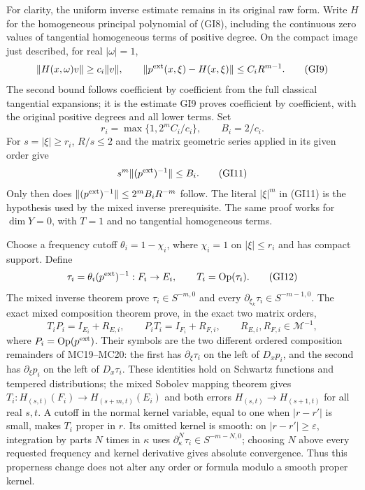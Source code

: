 \documentclass[
  11pt,
]{article}
\begin{document}
For clarity, the uniform inverse estimate remains in its original raw
form. Write \(H\) for the homogeneous principal polynomial of (GI8),
including the continuous zero values of tangential homogeneous terms of
positive degree. On the compact image just described, for real
\(|\omega|=1\), \[
 \|H(x,\omega)v\|\geq c_i\|v\|,
 \qquad \|p^{\rm ext}(x,\xi)-H(x,\xi)\|
 \leq C_i R^{m-1}.
 \tag{GI9}
\] The second bound follows coefficient by coefficient from the full
classical tangential expansions; it is the estimate GI9 proves
coefficient by coefficient, with the original positive degrees and all
lower terms. Set \[
 r_i=\max\{1,2^mC_i/c_i\},\qquad B_i=2/c_i.
 \tag{GI10}
\] For \(s=|\xi|\geq r_i\), \(R/s\leq2\) and the matrix geometric series
applied in its given order give \[
 s^m\|(p^{\rm ext})^{-1}\|\leq B_i.
 \tag{GI11}
\] Only then does \(\|(p^{\rm ext})^{-1}\|\leq2^mB_iR^{-m}\) follow. The
literal \(|\xi|^m\) in (GI11) is the hypothesis used by the mixed
inverse prerequisite. The same proof works for \(\dim Y=0\), with
\(T=1\) and no tangential homogeneous terms.

Choose a frequency cutoff \(\theta_i=1-\chi_i\), where \(\chi_i=1\) on
\(|\xi|\leq r_i\) and has compact support. Define \[
 \tau_i=\theta_i(p^{\rm ext})^{-1}:F_i\to E_i,
 \qquad T_i=\operatorname{Op}(\tau_i).
 \tag{GI12}
\] The mixed inverse theorem prove \(\tau_i\in S^{-m,0}\) and every
\(\partial_{\xi_k}\tau_i\in S^{-m-1,0}\). The exact mixed composition
theorem prove, in the exact two matrix orders, \[
 T_iP_i=I_{E_i}+R_{E,i},\qquad
 P_iT_i=I_{F_i}+R_{F,i},\qquad
 R_{E,i},R_{F,i}\in\mathscr M^{-1},
 \tag{GI13}
\] where \(P_i=\operatorname{Op}(p^{\rm ext})\). Their symbols are the
two different ordered composition remainders of MC19--MC20: the first
has \(\partial_\xi\tau_i\) on the left of \(D_xp_i\), and the second has
\(\partial_\xi p_i\) on the left of \(D_x\tau_i\). These identities hold
on Schwartz functions and tempered distributions; the mixed Sobolev
mapping theorem gives \(T_i:H_{(s,t)}(F_i)\to H_{(s+m,t)}(E_i)\) and
both errors \(H_{(s,t)}\to H_{(s+1,t)}\) for all real \(s,t\). A cutoff
in the normal kernel variable, equal to one when \(|r-r'|\) is small,
makes \(T_i\) proper in \(r\). Its omitted kernel is smooth: on
\(|r-r'|\geq\varepsilon\), integration by parts \(N\) times in
\(\kappa\) uses \(\partial_\kappa^N\tau_i\in S^{-m-N,0}\); choosing
\(N\) above every requested frequency and kernel derivative gives
absolute convergence. Thus this properness change does not alter any
order or formula modulo a smooth proper kernel.
\end{document}
